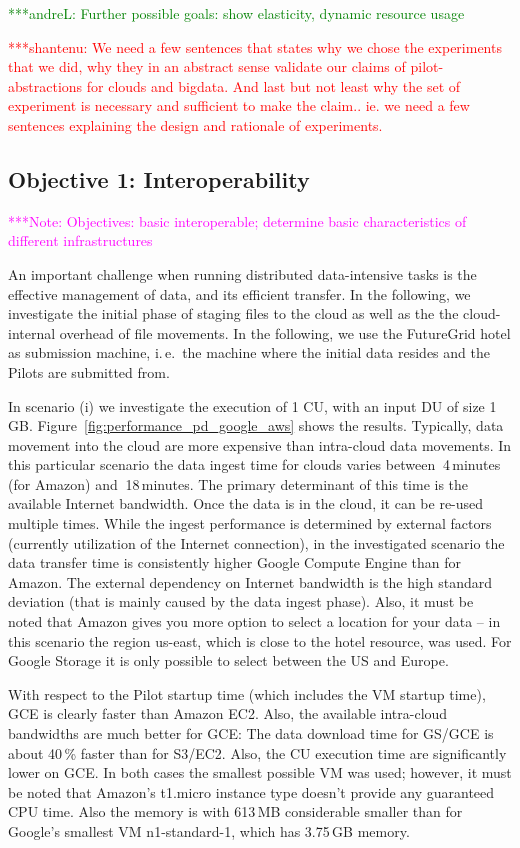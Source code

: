 \documentclass[times]{cpeauth}
\newcommand{\jhanote}[1]{ {\textcolor{red} { ***shantenu: #1 }}}
\newcommand{\alnote}[1]{ {\textcolor{green} { ***andreL: #1 }}}
\newcommand{\note}[1]{ {\textcolor{magenta} { ***Note: #1 }}}
\newcommand{\alnote}[1]{}
\newcommand{\jhanote}[1]{}
\newcommand{\note}[1]{}
\newcommand{\pilot}{Pilot\xspace}
\newcommand{\pilots}{Pilots\xspace}
\newcommand{\du}{DU\xspace}
\newcommand{\cu}{CU\xspace}
\begin{document}
\alnote{Further possible goals: show elasticity, dynamic resource usage}

\jhanote{We need a few sentences that states why we chose the
  experiments that we did, why they in an abstract sense validate our
  claims of pilot-abstractions for clouds and bigdata.  And last but
  not least why the set of experiment is necessary and sufficient to
  make the claim..  ie. we need a few sentences explaining the design
  and rationale of experiments.}
	
\subsection{Objective 1: Interoperability}
\label{sec:perf_interop}
\note{Objectives: basic interoperable; determine basic characteristics of 
different infrastructures}


An important challenge when running distributed data-intensive tasks is the 
effective management of data, and its efficient transfer. In the following, we 
investigate the initial phase of staging files to the cloud as well as the 
the cloud-internal overhead of file movements.  In the following, we use the 
FutureGrid hotel as submission machine, i.\,e.\ the machine where the initial 
data resides and the \pilots are submitted from.

In scenario (i) we investigate the execution of 1 \cu, with an input \du of
size 1\,GB. Figure~\ref{fig:performance_pd_google_aws} shows the results.
Typically, data movement into the cloud are more expensive than intra-cloud
data movements. In this particular scenario the data ingest time for clouds
varies between $~$4\,minutes (for Amazon) and $~$18\,minutes. The primary
determinant of this time is the available Internet bandwidth. Once the data is
in the cloud, it can be re-used multiple times. While the ingest performance
is determined by external factors (currently utilization of the Internet
connection), in the investigated scenario the data transfer time is
consistently higher Google Compute Engine than for Amazon. The external
dependency on Internet bandwidth is the high standard deviation (that is
mainly caused by the data ingest phase). Also, it must be noted that Amazon
gives you more option to select a location for your data -- in this scenario
the region us-east, which is close to the hotel resource, was used. For Google 
Storage it is only possible to select between the US and Europe.

With respect to the \pilot startup time (which includes the VM startup time), 
GCE is clearly faster than Amazon EC2. Also, the available intra-cloud 
bandwidths are much better for GCE: The data download time for GS/GCE is about 
40\,\% faster than for S3/EC2. Also, the \cu execution time are significantly 
lower on GCE. In both cases the smallest possible VM was used; however, it 
must be noted that Amazon's t1.micro instance type doesn't provide any 
guaranteed CPU time. Also the memory is with 613\,MB considerable smaller than 
for Google's smallest VM n1-standard-1, which has 3.75\,GB memory.
\end{document}
